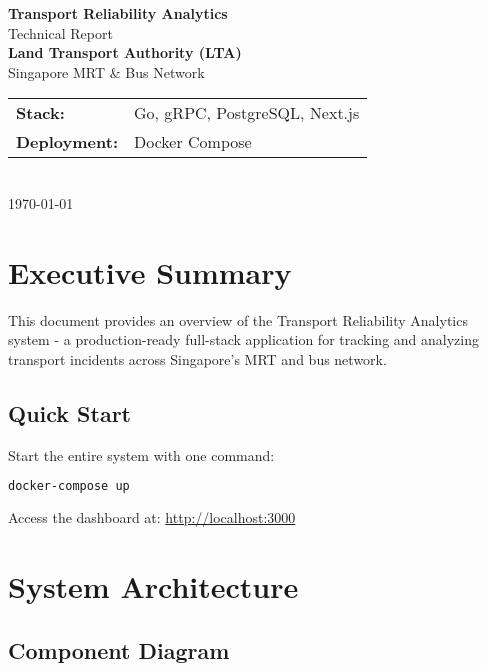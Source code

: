 \documentclass[11pt,a4paper]{article}
\begin{document}
\begin{titlepage}
    \centering
    \vspace*{2cm}
    {\Huge \textbf{Transport Reliability Analytics}}\\[0.5cm]
    {\Large Technical Report}\\[2cm]

    {\large \textbf{Land Transport Authority (LTA)}}\\[0.3cm]
    {\large Singapore MRT \& Bus Network}\\[2cm]

    \begin{tabular}{ll}
        \textbf{Stack:} & Go, gRPC, PostgreSQL, Next.js \\
        \textbf{Deployment:} & Docker Compose \\
    \end{tabular}\\[3cm]

    {\large \today}
    \vfill
\end{titlepage}

\tableofcontents
\newpage

\section{Executive Summary}

This document provides an overview of the Transport Reliability Analytics system - a production-ready full-stack application for tracking and analyzing transport incidents across Singapore's MRT and bus network.

\subsection{Quick Start}

Start the entire system with one command:
\begin{lstlisting}[language=bash]
docker-compose up
\end{lstlisting}

Access the dashboard at: \url{http://localhost:3000}

\section{System Architecture}

\subsection{Component Diagram}
\end{document}
